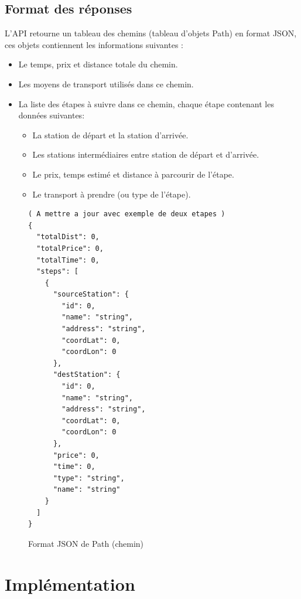 \subsection{Format des réponses}
\label{ref:formatReponse}
L'API retourne un tableau des chemins (tableau d'objets Path) en format JSON, ces objets contiennent les informations suivantes :
\begin{itemize}
	\item Le temps, prix et distance totale du chemin.
	\item Les moyens de transport utilisés dans ce chemin.
	\item La liste des étapes à suivre dans ce chemin, chaque étape contenant les données suivantes:
	      \begin{itemize}
	      	\item La station de départ et la station d'arrivée.
	      	\item Les stations intermédiaires entre station de départ et d'arrivée.
	      	\item Le prix, temps estimé et distance à parcourir de l'étape.
	      	\item Le transport à prendre (ou type de l'étape).
	      \end{itemize}
\end{itemize}

\begin{figure}
\begin{lstlisting}[]
( A mettre a jour avec exemple de deux etapes )
{
  "totalDist": 0,
  "totalPrice": 0,
  "totalTime": 0,
  "steps": [
    {
      "sourceStation": {
        "id": 0,
        "name": "string",
        "address": "string",
        "coordLat": 0,
        "coordLon": 0
      },
      "destStation": {
        "id": 0,
        "name": "string",
        "address": "string",
        "coordLat": 0,
        "coordLon": 0
      },
      "price": 0,
      "time": 0,
      "type": "string",
      "name": "string"
    }
  ]
}
\end{lstlisting}
\caption{Format JSON de Path (chemin)}
\end{figure}

\section{Implémentation}
\label{ref:Implementation}

